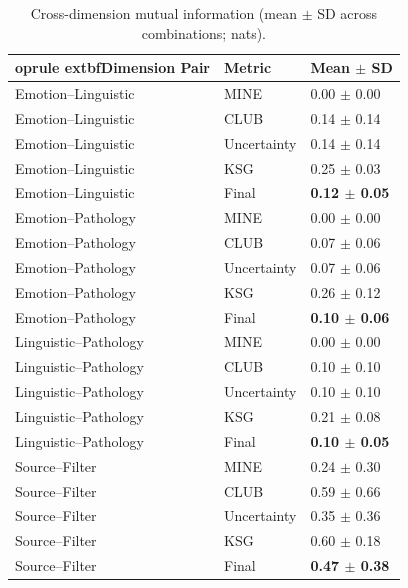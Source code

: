 \begin{table}[t]
\centering
\caption{Cross-dimension mutual information (mean $\pm$ SD across combinations; nats).}
\label{tab:mi_results_mean_sd}
\begin{tabular}{lll}
	oprule
	extbf{Dimension Pair} & \textbf{Metric} & \textbf{Mean $\pm$ SD} \\
\midrule
Emotion--Linguistic & MINE & 0.00 $\pm$ 0.00 \\
Emotion--Linguistic & CLUB & 0.14 $\pm$ 0.14 \\
Emotion--Linguistic & Uncertainty & 0.14 $\pm$ 0.14 \\
Emotion--Linguistic & KSG & 0.25 $\pm$ 0.03 \\
Emotion--Linguistic & Final & \textbf{0.12 $\pm$ 0.05} \\
Emotion--Pathology & MINE & 0.00 $\pm$ 0.00 \\
Emotion--Pathology & CLUB & 0.07 $\pm$ 0.06 \\
Emotion--Pathology & Uncertainty & 0.07 $\pm$ 0.06 \\
Emotion--Pathology & KSG & 0.26 $\pm$ 0.12 \\
Emotion--Pathology & Final & \textbf{0.10 $\pm$ 0.06} \\
Linguistic--Pathology & MINE & 0.00 $\pm$ 0.00 \\
Linguistic--Pathology & CLUB & 0.10 $\pm$ 0.10 \\
Linguistic--Pathology & Uncertainty & 0.10 $\pm$ 0.10 \\
Linguistic--Pathology & KSG & 0.21 $\pm$ 0.08 \\
Linguistic--Pathology & Final & \textbf{0.10 $\pm$ 0.05} \\
Source--Filter & MINE & 0.24 $\pm$ 0.30 \\
Source--Filter & CLUB & 0.59 $\pm$ 0.66 \\
Source--Filter & Uncertainty & 0.35 $\pm$ 0.36 \\
Source--Filter & KSG & 0.60 $\pm$ 0.18 \\
Source--Filter & Final & \textbf{0.47 $\pm$ 0.38} \\
\bottomrule
\end{tabular}
\end{table}


